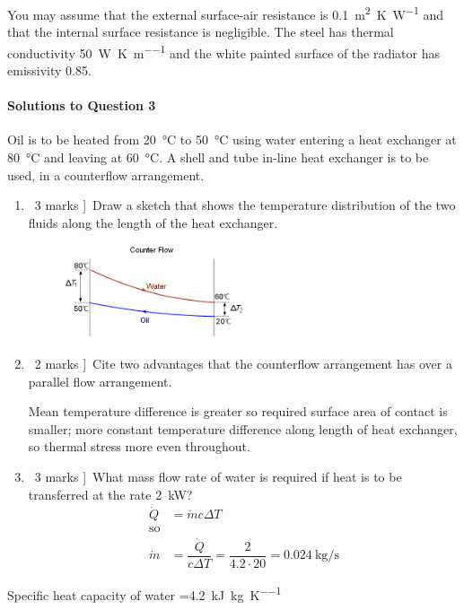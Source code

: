\documentclass[a4paper,12pt,fleqn]{article}
\begin{document}
You may assume that the external surface-air resistance is \SI{0.1} {\metre\squared\kelvin\per\watt} and that the internal surface resistance is negligible. The steel has thermal conductivity \SI{50}{\watt\per\kelvin\per\metre} and the white painted surface of the radiator has emissivity 0.85.

\bigskip
\paragraph{\textbf{Solutions to Question 3} \ }
Oil is to be heated from \SI{20}{\celsius} to \SI{50}{\celsius} using water entering a heat exchanger at \SI{80}{\celsius} and leaving at \SI{60}{\celsius}. A shell and tube in-line heat exchanger is to be used, in a counterflow arrangement. 
\begin{enumerate}[label=\alph*)]
\item \lbrack\ 3 marks ]\ Draw a sketch that shows the temperature distribution of the two fluids along the length of the heat exchanger.\\
\begin{figure}[h]
\centering
\includegraphics[width=0.5\textwidth]{./figures/CounterFlowHeatExchanger}
\end{figure}
\item \lbrack\ 2 marks ]\ Cite two advantages that the counterflow arrangement has over a parallel flow arrangement.\par
Mean temperature difference is greater so required surface area of contact is smaller; more constant temperature difference along length of heat exchanger, so thermal stress more even throughout.
\item \lbrack\ 3 marks ]\ What mass flow rate of water is required if heat is to be transferred at the rate \SI{2}{\kilo\watt}?
\begin{align*}
\dot Q&=\dot m c\Delta T\\
\mathrm{so}\\
\dot m &= \dfrac{\dot Q}{c\Delta T}=\dfrac{2}{4.2\cdot 20}=\SI{0.024}{\kg\per\second}
\end{align*}
\end{enumerate}
Specific heat capacity of water =\SI{4.2}{\kilo\joule\per\kg\per\kelvin}

\end{document}
